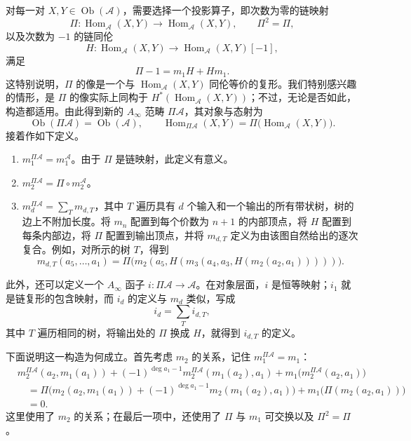对每一对 $X,Y\in\operatorname{Ob}(\mathcal A)$，需要选择一个投影算子，即次数为零的链映射
\[
\Pi\colon\operatorname{Hom}_{\mathcal A}(X,Y)
\longrightarrow\operatorname{Hom}_{\mathcal A}(X,Y),
\qquad\Pi^2=\Pi,
\]
以及次数为 $-1$ 的链同伦
\[
H\colon\operatorname{Hom}_{\mathcal A}(X,Y)
\longrightarrow\operatorname{Hom}_{\mathcal A}(X,Y)[-1],
\]
满足
\[
\Pi-1=m_1H+Hm_1.
\]
这特别说明，$\Pi$ 的像是一个与 $\operatorname{Hom}_{\mathcal A}(X,Y)$ 同伦等价的复形。我们特别感兴趣的情形，是 $\Pi$ 的像实际上同构于 $H^*(\operatorname{Hom}_{\mathcal A}(X,Y))$；不过，无论是否如此，构造都适用。由此得到新的 $A_\infty$ 范畴 $\Pi\mathcal A$，其对象与态射为
\[
\operatorname{Ob}(\Pi\mathcal A)=\operatorname{Ob}(\mathcal A),
\qquad
\operatorname{Hom}_{\Pi\mathcal A}(X,Y)
=\Pi\bigl(\operatorname{Hom}_{\mathcal A}(X,Y)\bigr).
\]
接着作如下定义。
\begin{enumerate}
\item $m_1^{\Pi\mathcal A}=m_1^{\mathcal A}$。由于 $\Pi$ 是链映射，此定义有意义。
\item $m_2^{\Pi\mathcal A}=\Pi\circ m_2^{\mathcal A}$。
\item $m_d^{\Pi\mathcal A}=\sum_Tm_{d,T}$，其中 $T$ 遍历具有 $d$ 个输入和一个输出的所有带状树，树的边上不附加长度。将 $m_n$ 配置到每个价数为 $n+1$ 的内部顶点，将 $H$ 配置到每条内部边，将 $\Pi$ 配置到输出顶点，并将 $m_{d,T}$ 定义为由该图自然给出的逐次复合。例如，对所示的树 $T$，得到
\[
m_{d,T}(a_5,\ldots,a_1)
=\Pi\bigl(m_2(a_5,H(m_3(a_4,a_3,H(m_2(a_2,a_1)))))\bigr).
\]
\end{enumerate}

此外，还可以定义一个 $A_\infty$ 函子 $i\colon\Pi\mathcal A\to\mathcal A$。在对象层面，$i$ 是恒等映射；$i_1$ 就是链复形的包含映射，而 $i_d$ 的定义与 $m_d$ 类似，写成
\[
i_d=\sum_Ti_{d,T},
\]
其中 $T$ 遍历相同的树，将输出处的 $\Pi$ 换成 $H$，就得到 $i_{d,T}$ 的定义。

\begin{figure}[H]
\centering
{}
\BookNumberOnlyCaption\label{fig:8.10}
\end{figure}

下面说明这一构造为何成立。首先考虑 $m_2$ 的关系，记住 $m_1^{\Pi\mathcal A}=m_1$：
\[
\begin{aligned}
&m_2^{\Pi\mathcal A}(a_2,m_1(a_1))
+(-1)^{\deg a_1-1}m_2^{\Pi\mathcal A}(m_1(a_2),a_1)
+m_1\bigl(m_2^{\Pi\mathcal A}(a_2,a_1)\bigr)\\
&\quad=\Pi\bigl(m_2(a_2,m_1(a_1))
+(-1)^{\deg a_1-1}m_2(m_1(a_2),a_1)\bigr)
+m_1\bigl(\Pi(m_2(a_2,a_1))\bigr)\\
&\quad=0.
\end{aligned}
\]
这里使用了 $m_2$ 的关系；在最后一项中，还使用了 $\Pi$ 与 $m_1$ 可交换以及 $\Pi^2=\Pi$。


